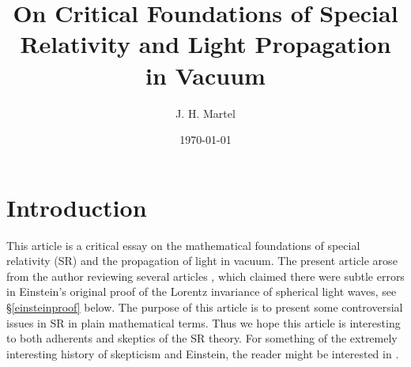 \documentclass[12pt]{amsart}
\begin{document}
\title[Foundations of SR and Light Propagation in Vacuum]{On Critical Foundations of Special Relativity and Light Propagation in Vacuum}


\author{J. H. Martel}
\date{\today}
\maketitle

\begin{abstract}
\end{abstract}
\tableofcontents







\section{Introduction}
This article is a critical essay on the mathematical foundations of special relativity (SR) and the propagation of light in vacuum. The present article arose from the author reviewing several articles \cite{bryant}, \cite{crothers} which claimed there were subtle errors in Einstein's original proof of the Lorentz invariance of spherical light waves, see \S \ref{einsteinproof} below. The purpose of this article is to present some controversial issues in SR in plain mathematical terms. Thus we hope this article is interesting to both adherents and skeptics of the SR theory. For something of the extremely interesting history of skepticism and Einstein, the reader might be interested in \cite{kennefick}.

\end{document}
